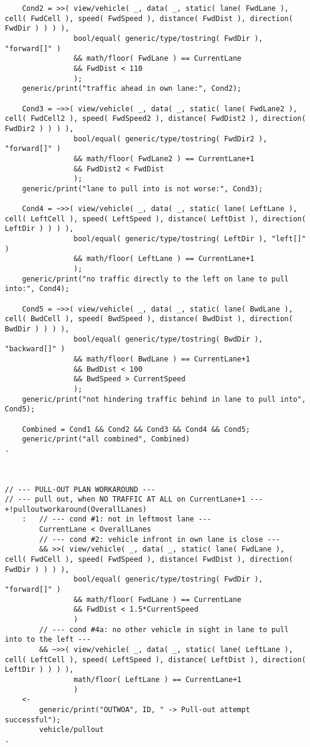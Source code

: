 \begin{lstlisting}
    Cond2 = >>( view/vehicle( _, data( _, static( lane( FwdLane ), cell( FwdCell ), speed( FwdSpeed ), distance( FwdDist ), direction( FwdDir ) ) ) ),
                bool/equal( generic/type/tostring( FwdDir ), "forward[]" ) 
                && math/floor( FwdLane ) == CurrentLane
                && FwdDist < 110 
                ); 
    generic/print("traffic ahead in own lane:", Cond2); 

    Cond3 = ~>>( view/vehicle( _, data( _, static( lane( FwdLane2 ), cell( FwdCell2 ), speed( FwdSpeed2 ), distance( FwdDist2 ), direction( FwdDir2 ) ) ) ),
                bool/equal( generic/type/tostring( FwdDir2 ), "forward[]" ) 
                && math/floor( FwdLane2 ) == CurrentLane+1
                && FwdDist2 < FwdDist 
                ); 
    generic/print("lane to pull into is not worse:", Cond3); 

    Cond4 = ~>>( view/vehicle( _, data( _, static( lane( LeftLane ), cell( LeftCell ), speed( LeftSpeed ), distance( LeftDist ), direction( LeftDir ) ) ) ),
                bool/equal( generic/type/tostring( LeftDir ), "left[]" ) 
                && math/floor( LeftLane ) == CurrentLane+1
                );
    generic/print("no traffic directly to the left on lane to pull into:", Cond4);

    Cond5 = ~>>( view/vehicle( _, data( _, static( lane( BwdLane ), cell( BwdCell ), speed( BwdSpeed ), distance( BwdDist ), direction( BwdDir ) ) ) ),
                bool/equal( generic/type/tostring( BwdDir ), "backward[]" ) 
                && math/floor( BwdLane ) == CurrentLane+1
                && BwdDist < 100
                && BwdSpeed > CurrentSpeed 
                );
    generic/print("not hindering traffic behind in lane to pull into", Cond5);

    Combined = Cond1 && Cond2 && Cond3 && Cond4 && Cond5;
    generic/print("all combined", Combined)
.



// --- PULL-OUT PLAN WORKAROUND ---
// --- pull out, when NO TRAFFIC AT ALL on CurrentLane+1 --- 
+!pulloutworkaround(OverallLanes)
    :   // --- cond #1: not in leftmost lane ---
        CurrentLane < OverallLanes 
        // --- cond #2: vehicle infront in own lane is close ---
        && >>( view/vehicle( _, data( _, static( lane( FwdLane ), cell( FwdCell ), speed( FwdSpeed ), distance( FwdDist ), direction( FwdDir ) ) ) ), 
                bool/equal( generic/type/tostring( FwdDir ), "forward[]" ) 
                && math/floor( FwdLane ) == CurrentLane
                && FwdDist < 1.5*CurrentSpeed 
                )
        // --- cond #4a: no other vehicle in sight in lane to pull into to the left ---
        && ~>>( view/vehicle( _, data( _, static( lane( LeftLane ), cell( LeftCell ), speed( LeftSpeed ), distance( LeftDist ), direction( LeftDir ) ) ) ),
                math/floor( LeftLane ) == CurrentLane+1 
                )
    <-
        generic/print("OUTWOA", ID, " -> Pull-out attempt successful");
        vehicle/pullout
.




\end{lstlisting}
